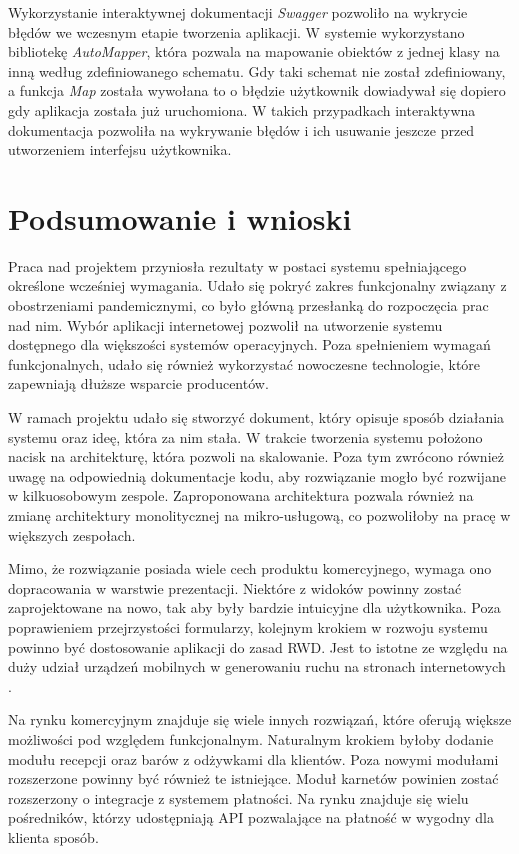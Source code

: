 \documentclass[a4paper,twoside,12pt]{book}
\begin{document}
{Wykorzystanie interaktywnej dokumentacji \textit{Swagger} pozwoliło na wykrycie błędów we wczesnym etapie tworzenia aplikacji. W systemie wykorzystano bibliotekę \textit{AutoMapper}, która pozwala na mapowanie obiektów z jednej klasy na inną według zdefiniowanego schematu. Gdy taki schemat nie został zdefiniowany, a funkcja \textit{Map} została wywołana to o błędzie użytkownik dowiadywał się dopiero gdy aplikacja została już uruchomiona. W takich przypadkach interaktywna dokumentacja pozwoliła na wykrywanie błędów i ich usuwanie jeszcze przed utworzeniem interfejsu użytkownika.

\chapter{Podsumowanie i wnioski}
\label{chap:summary}
Praca nad projektem przyniosła rezultaty w postaci systemu spełniającego określone wcześniej wymagania. Udało się pokryć zakres funkcjonalny związany z obostrzeniami pandemicznymi, co było główną przesłanką do rozpoczęcia prac nad nim. Wybór aplikacji internetowej pozwolił na utworzenie systemu dostępnego dla większości systemów operacyjnych. Poza spełnieniem wymagań funkcjonalnych, udało się również wykorzystać nowoczesne technologie, które zapewniają dłuższe wsparcie producentów.

W ramach projektu udało się stworzyć dokument, który opisuje sposób działania systemu oraz ideę, która za nim stała. W trakcie tworzenia systemu położono nacisk na architekturę, która pozwoli na skalowanie. Poza tym zwrócono również uwagę na odpowiednią dokumentacje kodu, aby rozwiązanie mogło być rozwijane w kilkuosobowym zespole. Zaproponowana architektura pozwala również na zmianę architektury monolitycznej na mikro-usługową, co pozwoliłoby na pracę w większych zespołach.

Mimo, że rozwiązanie posiada wiele cech produktu komercyjnego, wymaga ono dopracowania w warstwie prezentacji. Niektóre z widoków powinny zostać zaprojektowane na nowo, tak aby były bardzie intuicyjne dla użytkownika. Poza poprawieniem przejrzystości formularzy, kolejnym krokiem w rozwoju systemu powinno być dostosowanie aplikacji do zasad RWD. Jest to istotne ze względu na duży udział urządzeń mobilnych w generowaniu ruchu na stronach internetowych \cite{bib:mobileVsDesktop}.

Na rynku komercyjnym znajduje się wiele innych rozwiązań, które oferują większe możliwości pod względem funkcjonalnym. Naturalnym krokiem byłoby dodanie modułu recepcji oraz barów z odżywkami dla klientów. Poza nowymi modułami rozszerzone powinny być również te istniejące. Moduł karnetów powinien zostać rozszerzony o integracje z systemem płatności. Na rynku znajduje się wielu pośredników, którzy udostępniają API pozwalające na płatność w wygodny dla klienta sposób.

}
\end{document}
